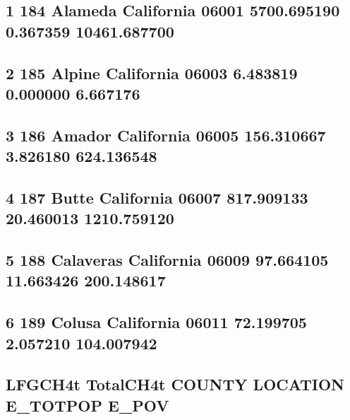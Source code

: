 \documentclass[
  12pt,
]{article}
\begin{document}
\hypertarget{alameda-california-06001-5700.695190-0.367359-10461.687700}{%
\subsection{1 184 Alameda California 06001 5700.695190 0.367359
10461.687700}\label{alameda-california-06001-5700.695190-0.367359-10461.687700}}

\hypertarget{alpine-california-06003-6.483819-0.000000-6.667176}{%
\subsection{2 185 Alpine California 06003 6.483819 0.000000
6.667176}\label{alpine-california-06003-6.483819-0.000000-6.667176}}

\hypertarget{amador-california-06005-156.310667-3.826180-624.136548}{%
\subsection{3 186 Amador California 06005 156.310667 3.826180
624.136548}\label{amador-california-06005-156.310667-3.826180-624.136548}}

\hypertarget{butte-california-06007-817.909133-20.460013-1210.759120}{%
\subsection{4 187 Butte California 06007 817.909133 20.460013
1210.759120}\label{butte-california-06007-817.909133-20.460013-1210.759120}}

\hypertarget{calaveras-california-06009-97.664105-11.663426-200.148617}{%
\subsection{5 188 Calaveras California 06009 97.664105 11.663426
200.148617}\label{calaveras-california-06009-97.664105-11.663426-200.148617}}

\hypertarget{colusa-california-06011-72.199705-2.057210-104.007942}{%
\subsection{6 189 Colusa California 06011 72.199705 2.057210
104.007942}\label{colusa-california-06011-72.199705-2.057210-104.007942}}

\hypertarget{lfgch4t-totalch4t-county-location-e_totpop-e_pov}{%
\subsection{LFGCH4t TotalCH4t COUNTY LOCATION E\_TOTPOP
E\_POV}\label{lfgch4t-totalch4t-county-location-e_totpop-e_pov}}
\end{document}
